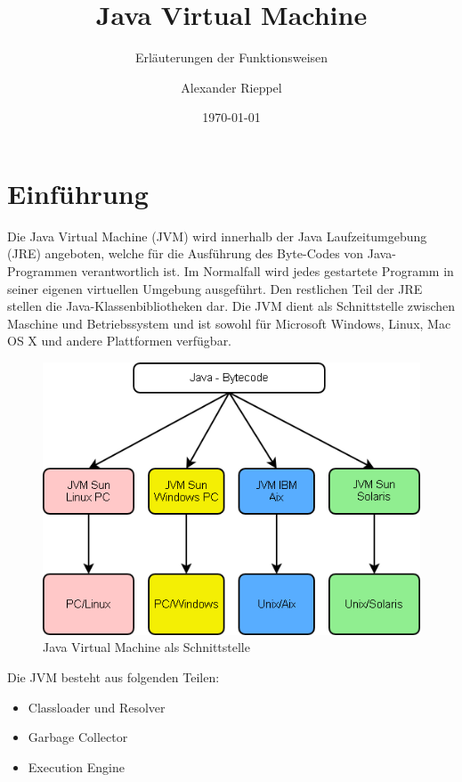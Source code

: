 \documentclass[a4paper,14pt]{scrreprt}
\begin{document}
\author{Alexander Rieppel} %
\title{Java Virtual Machine} %
\subject{FT-Ausarbeitung} %
\subtitle{Erläuterungen der Funktionsweisen} %
\date{\today} %
\publishers{5AHITT} %

\maketitle
\tableofcontents
 

\chapter{Einführung}
Die Java Virtual Machine (JVM) wird innerhalb der Java Laufzeitumgebung (JRE) angeboten, welche für die Ausführung des Byte-Codes von Java-Programmen verantwortlich ist. Im Normalfall wird jedes gestartete Programm in seiner eigenen virtuellen Umgebung ausgeführt. Den restlichen Teil der JRE stellen die Java-Klassenbibliotheken dar. Die JVM dient als Schnittstelle zwischen Maschine und Betriebssystem und ist sowohl für Microsoft Windows, Linux, Mac OS X und andere  Plattformen verfügbar. 
\begin{figure}[h!]
\centering
\includegraphics[width=1\linewidth]{./Java-jvm}
\caption[Java Virtual Machine als Schnittstelle]{Java Virtual Machine als Schnittstelle}
\label{fig:Java-jvm}
\end{figure}\newpage
Die JVM besteht aus folgenden Teilen:
\begin{itemize}
\item Classloader und Resolver
\item Garbage Collector
\item Execution Engine
\end{itemize}
\end{document}
